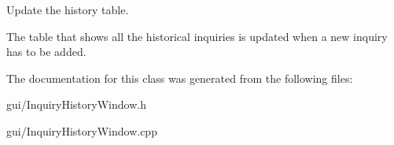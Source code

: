 Update the history table. 

The table that shows all the historical inquiries is updated when a new inquiry has to be added. 

The documentation for this class was generated from the following files\+:\begin{DoxyCompactItemize}
\item 
gui/Inquiry\+History\+Window.\+h\item 
gui/Inquiry\+History\+Window.\+cpp\end{DoxyCompactItemize}
